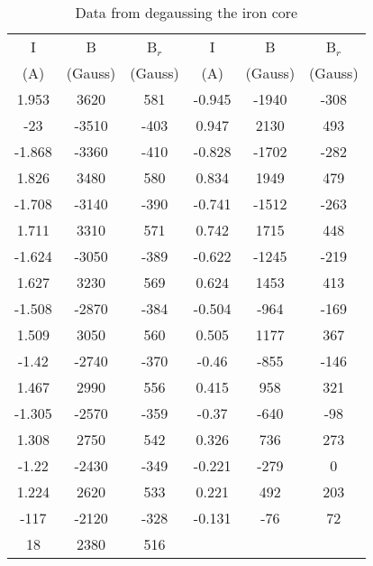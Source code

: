 \begin{table}[H]
\centering
\begin{tabular}{|ccc|ccc|} \hline
    I & B & B$_r$ & I & B & B$_r$ \\ 
    (A) & (Gauss) &(Gauss) & (A) &(Gauss) & (Gauss) \\ \hline
    1.953 &  3620 &  581 & -0.945 & -1940 & -308 \\
    -23  & -3510 & -403 & 0.947  & 2130  & 493  \\
    -1.868 & -3360 & -410 & -0.828 & -1702 & -282 \\
     1.826 &  3480 &  580 & 0.834  & 1949  & 479  \\
    -1.708 & -3140 & -390 & -0.741 & -1512 & -263 \\
     1.711 &  3310 &  571 & 0.742  & 1715  & 448  \\
    -1.624 & -3050 & -389 & -0.622 & -1245 & -219 \\
     1.627 &  3230 &  569 & 0.624  & 1453  & 413  \\
    -1.508 & -2870 & -384 & -0.504 & -964  & -169 \\
     1.509 &  3050 &  560 & 0.505  & 1177  & 367  \\
    -1.42  & -2740 & -370 & -0.46  & -855  & -146 \\
     1.467 &  2990 &  556 & 0.415  & 958   & 321  \\
    -1.305 & -2570 & -359 & -0.37  & -640  & -98  \\
     1.308 &  2750 &  542 & 0.326  & 736   & 273  \\
    -1.22  & -2430 & -349 & -0.221 & -279  & 0    \\
     1.224 &  2620 &  533 & 0.221  & 492   & 203  \\
    -117 & -2120 & -328 & -0.131 & -76   & 72   \\
     18  &  2380 &  516 &        &         &        \\
    \hline
    \end{tabular}
    \label{tab:2}
\caption{Data from degaussing the iron core}
\end{table}